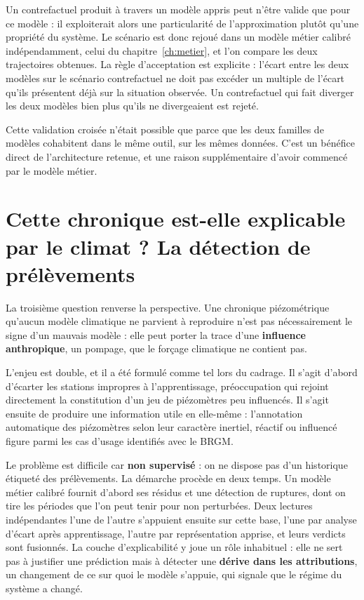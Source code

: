 Un contrefactuel produit à travers un modèle appris peut n'être valide que pour ce modèle : il
exploiterait alors une particularité de l'approximation plutôt qu'une propriété du système. Le
scénario est donc rejoué dans un modèle métier calibré indépendamment, celui du
chapitre~\ref{ch:metier}, et l'on compare les deux trajectoires obtenues. La règle d'acceptation
est explicite : l'écart entre les deux modèles sur le scénario contrefactuel ne doit pas excéder
un multiple de l'écart qu'ils présentent déjà sur la situation observée. Un contrefactuel qui
fait diverger les deux modèles bien plus qu'ils ne divergeaient est rejeté.

Cette validation croisée n'était possible que parce que les deux familles de modèles cohabitent
dans le même outil, sur les mêmes données. C'est un bénéfice direct de l'architecture retenue,
et une raison supplémentaire d'avoir commencé par le modèle métier.

\section{Cette chronique est-elle explicable par le climat ? La détection de prélèvements}

La troisième question renverse la perspective. Une chronique piézométrique qu'aucun modèle
climatique ne parvient à reproduire n'est pas nécessairement le signe d'un mauvais modèle : elle
peut porter la trace d'une \textbf{influence anthropique}, un pompage, que le forçage
climatique ne contient pas.

L'enjeu est double, et il a été formulé comme tel lors du cadrage. Il s'agit d'abord d'écarter
les stations impropres à l'apprentissage, préoccupation qui rejoint directement la constitution
d'un jeu de piézomètres peu influencés. Il s'agit ensuite de produire une information utile en
elle-même : l'annotation automatique des piézomètres selon leur caractère inertiel, réactif ou
influencé figure parmi les cas d'usage identifiés avec le BRGM.

Le problème est difficile car \textbf{non supervisé} : on ne dispose pas d'un historique
étiqueté des prélèvements. La démarche procède en deux temps. Un modèle métier calibré fournit d'abord ses résidus et une
détection de ruptures, dont on tire les périodes que l'on peut tenir pour non perturbées.
Deux lectures indépendantes l'une de l'autre s'appuient ensuite sur cette base, l'une par analyse
d'écart après apprentissage, l'autre par représentation apprise, et leurs verdicts sont fusionnés. La couche
d'explicabilité y joue un rôle inhabituel : elle ne sert pas à justifier une prédiction mais à
détecter une \textbf{dérive dans les attributions}, un changement de ce sur quoi le modèle
s'appuie, qui signale que le régime du système a changé.

